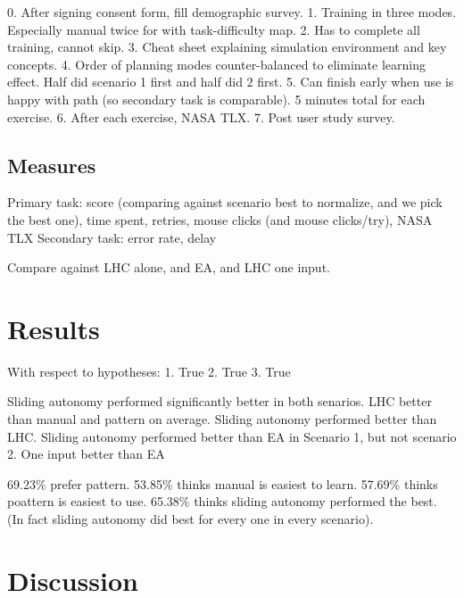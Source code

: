 \documentclass[journal]{IEEEtran}
\begin{document}
0. After signing consent form, fill demographic survey.
1. Training in three modes. Especially manual twice for with task-difficulty map.
2. Has to complete all training, cannot skip.
3. Cheat sheet explaining simulation environment and key concepts.
4. Order of planning modes counter-balanced to eliminate learning effect. Half did scenario 1 first and half did 2 first.
5. Can finish early when use is happy with path (so secondary task is comparable). 5 minutes total for each exercise.
6. After each exercise, NASA TLX.
7. Post user study survey. 

\subsection{Measures}

Primary task: score (comparing against scenario best to normalize, and we pick the best one), time spent, retries, mouse clicks (and mouse clicks/try), NASA TLX
Secondary task: error rate, delay

Compare against LHC alone, and EA, and LHC one input.

\section{Results} 
\label{sec:Results}

With respect to hypotheses:
1. True
2. True
3. True

Sliding autonomy performed significantly better in both senarios.
LHC better than manual and pattern on average.
Sliding autonomy performed better than LHC.
Sliding autonomy performed better than EA in Scenario 1, but not scenario 2.
One input better than EA





69.23\% prefer pattern.
53.85\% thinks manual is easiest to learn. 
57.69\% thinks poattern is easiest to use.
65.38\% thinks sliding autonomy performed the best. (In fact sliding autonomy did best for every one in every scenario).



\section{Discussion} 
\label{sec:Discussion}
\end{document}
